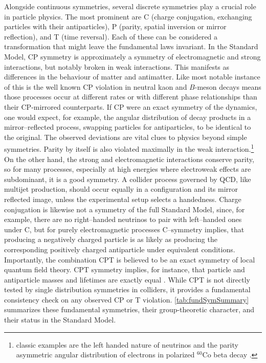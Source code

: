         Alongside continuous symmetries, several discrete symmetries play a crucial role in particle physics.
        The most prominent are C (charge conjugation, exchanging particles with their antiparticles), P (parity, spatial inversion or mirror reflection), and T (time reversal).
        Each of these can be considered a transformation that might leave the fundamental laws invariant.
        In the Standard Model, CP symmetry is approximately a symmetry of electromagnetic and strong interactions, but notably broken in weak interactions.
        This manifests as differences in the behaviour of matter and antimatter.
        Like most notable instance of this is the well known CP violation in neutral kaon and $B$-meson decays means those processes occur at different rates or with different phase relationships than their CP-mirrored counterparts.\kd{}
        If CP were an exact symmetry of the dynamics, one would expect, for example, the angular distribution of decay products in a mirror--reflected process, swapping particles for antiparticles, to be identical to the original.
        The observed deviations are vital clues to physics beyond simple symmetries.
        Parity by itself is also violated maximally in the weak interaction.\footnote{ classic examples are the left handed nature of neutrinos and the parity asymmetric angular distribution of electrons in polarized $^{60}$Co beta decay .}
        On the other hand, the strong and electromagnetic interactions conserve parity, so for many processes, especially at high energies where electroweak effects are subdominant, it is a good symmetry.
        A collider process governed by QCD, like multijet production, should occur equally in a configuration and its mirror reflected image, unless the experimental setup selects a handedness.
        Charge conjugation is likewise not a symmetry of the full Standard Model, since, for example, there are no right--handed neutrinos to pair with left--handed ones under C, but for purely electromagnetic processes C--symmetry implies, that producing a negatively charged particle is as likely as producing the corresponding positively charged antiparticle under equivalent conditions.
        Importantly, the combination CPT is believed to be an exact symmetry of local quantum field theory.
        CPT symmetry implies, for instance, that particle and antiparticle masses and lifetimes are exactly equal .
        While CPT is not directly tested by single distribution symmetries in colliders, it provides a fundamental consistency check on any observed CP or T violation. \cref{tab:fundSymSummary} summarizes these fundamental symmetries, their group-theoretic character, and their status in the Standard Model.
